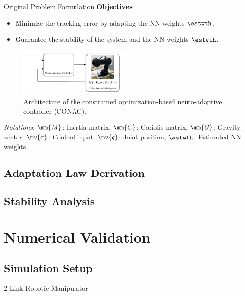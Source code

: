\documentclass[8pt, aspectratio=169]{beamer}
\begin{document}
\begin{frame}{Original Problem Formulation}
  \large\textbf{Objectives}:
  \begin{itemize}
    \item Minimize the tracking error by adapting the NN weights $\estwth$.
    \item Guarantee the stability of the system and the NN weights $\estwth$.
  \end{itemize}
  
  \begin{figure}
    \includegraphics[width=0.5\textwidth]{figures/problem.drawio.pdf}
    \caption{Architecture of the constrained optimization-based neuro-adaptive controller (CONAC).}
  \end{figure}

  \small{
    \textit{Notations}: 
    $\mm{M}$: Inertia matrix, $\mm{C}$: Coriolis matrix, $\mm{G}$: Gravity vector, $\mv{\tau}$: Control input, $\mv{q}$: Joint position, $\estwth$: Estimated NN weights.
  }

\end{frame}

\subsection{Adaptation Law Derivation}

\subsection{Stability Analysis}

\section{Numerical Validation}

\subsection{Simulation Setup}
\begin{frame}{2-Link Robotic Manipulator}
    
\end{frame}
\end{document}
